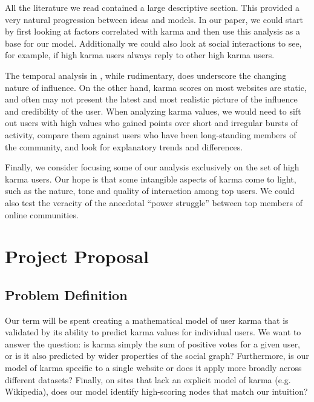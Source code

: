 \documentclass[10pt]{article}
\begin{document}
All the literature we read contained a large descriptive section. This provided
a very natural progression between ideas and models. In our paper, we could
start by first looking at factors correlated with karma and then use this
analysis as a base for our model. Additionally we could also look at social
interactions to see, for example, if high karma users always reply to other high
karma users.

The temporal analysis in \citet{cha2010measuring}, while rudimentary, does
underscore the changing nature of influence. On the other hand, karma scores on
most websites are static, and often may not present the latest and most
realistic picture of the influence and credibility of the user. 
When analyzing karma values, we would need to sift out users with high values
who gained points over short and irregular bursts of activity, compare them
against users who have been long-standing members of the community, and look for
explanatory trends and differences.

Finally, we consider focusing some of our analysis exclusively on the set of
high karma users. Our hope is that some intangible aspects of karma come to
light, such as the nature, tone and quality of interaction among top users. We
could also test the veracity of the anecdotal ``power struggle'' between top
members of online communities.

\section{Project Proposal} \subsection{Problem Definition}
Our term will be spent creating a mathematical model of user karma that is
validated by its ability to predict karma values for individual users. We want
to answer the question: is karma simply the sum of positive votes for a given
user, or is it also predicted by wider properties of the social graph?
Furthermore, is our model of karma specific to a single website or does it apply
more broadly across different datasets?  Finally, on sites that lack an explicit
model of karma (e.g. Wikipedia), does our model identify high-scoring nodes that
match our intuition?
\end{document}
